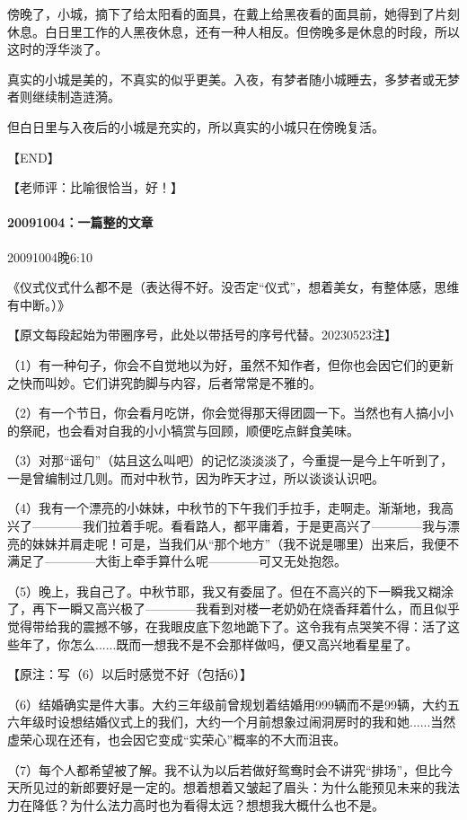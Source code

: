 \documentclass[UTF8]{book}
\begin{document}
傍晚了，小城，摘下了给太阳看的面具，在戴上给黑夜看的面具前，她得到了片刻休息。白日里工作的人黑夜休息，还有一种人相反。但傍晚多是休息的时段，所以这时的浮华淡了。

真实的小城是美的，不真实的似乎更美。入夜，有梦者随小城睡去，多梦者或无梦者则继续制造涟漪。

但白日里与入夜后的小城是充实的，所以真实的小城只在傍晚复活。

【END】

【老师评：比喻很恰当，好！】


\paragraph{20091004：一篇整的文章}

20091004晚6:10

《仪式仪式什么都不是（表达得不好。没否定“仪式”，想着美女，有整体感，思维有中断。）》

【原文每段起始为带圈序号，此处以带括号的序号代替。20230523注】

（1）有一种句子，你会不自觉地以为好，虽然不知作者，但你也会因它们的更新之快而叫妙。它们讲究韵脚与内容，后者常常是不雅的。

（2）有一个节日，你会看月吃饼，你会觉得那天得团圆一下。当然也有人搞小小的祭祀，也会看对自我的小小犒赏与回顾，顺便吃点鲜食美味。

（3）对那“谣句”（姑且这么叫吧）的记忆淡淡淡了，今重提一是今上午听到了，一是曾编制过几则。而对中秋节，因为昨天才过，所以谈谈认识吧。

（4）我有一个漂亮的小妹妹，中秋节的下午我们手拉手，走啊走。渐渐地，我高兴了————我们拉着手呢。看看路人，都平庸着，于是更高兴了————我与漂亮的妹妹并肩走呢！可是，当我们从“那个地方”（我不说是哪里）出来后，我便不满足了————大街上牵手算什么呢————可又无处抱怨。

（5）晚上，我自己了。中秋节耶，我又有委屈了。但在不高兴的下一瞬我又糊涂了，再下一瞬又高兴极了————我看到对楼一老奶奶在烧香拜着什么，而且似乎觉得带给我的震撼不够，在我眼皮底下忽地跪下了。这令我有点哭笑不得：活了这些年了，你怎么......既而一想我不是不会那样做吗，便又高兴地看星星了。

【原注：写（6）以后时感觉不好（包括6）】

（6）结婚确实是件大事。大约三年级前曾规划着结婚用999辆而不是99辆，大约五六年级时设想结婚仪式上的我们，大约一个月前想象过闹洞房时的我和她......当然虚荣心现在还有，也会因它变成“实荣心”概率的不大而沮丧。

（7）每个人都希望被了解。我不认为以后若做好鸳鸯时会不讲究“排场”，但比今天所见过的新郎要好是一定的。想着想着又皱起了眉头：为什么能预见未来的我法力在降低？为什么法力高时也为看得太远？想想我大概什么也不是。
\end{document}
